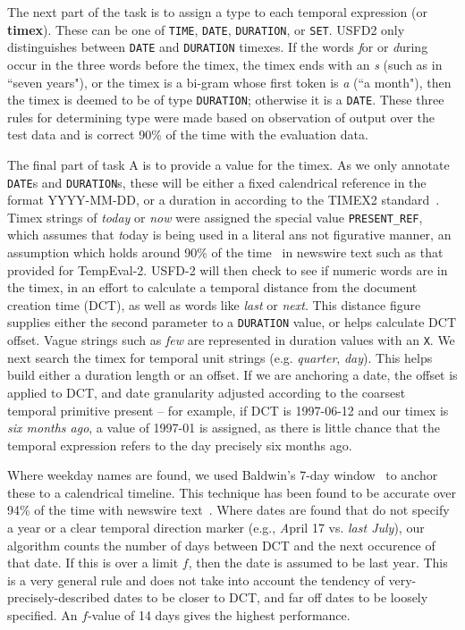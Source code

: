 \documentclass[11pt]{article}
\begin{document}
The next part of the task is to assign a type to each temporal expression (or {\bf timex}). These can be one of {\tt TIME}, {\tt DATE}, {\tt DURATION}, or {\tt SET}. USFD2 only distinguishes between {\tt DATE} and {\tt DURATION} timexes. If the words {\emph for} or {\emph during} occur in the three words before the timex, the timex ends with an {\emph s} (such as in ``seven years"), or the timex is a bi-gram whose first token is {\emph a} (``a month"), then the timex is deemed to be of type {\tt DURATION}; otherwise it is a {\tt DATE}. These three rules for determining type were made based on observation of output over the test data and is correct 90\% of the time with the evaluation data.

The final part of task A is to provide a value for the timex. As we only annotate {\tt DATE}s and {\tt DURATION}s, these will be either a fixed calendrical reference in the format YYYY-MM-DD, or a duration in according to the TIMEX2 standard~\cite{ferro2005tides}. Timex strings of \emph{today} or \emph{now} were assigned the special value {\tt PRESENT\_REF}, which assumes that {\emph today} is being used in a literal ans not figurative manner, an assumption which holds around 90\% of the time~\cite{ahn2005towards} in newswire text such as that provided for TempEval-2. USFD-2 will then check to see if numeric words are in the timex, in an effort to calculate a temporal distance from the document creation time (DCT), as well as words like \emph{last} or \emph{next}. This distance figure supplies either the second parameter to a {\tt DURATION} value, or helps calculate DCT offset. Vague strings such as \emph{few} are represented in duration values with an {\tt X}. We next search the timex for temporal unit strings (e.g. \emph{quarter}, \emph{day}). This helps build either a duration length or an offset. If we are anchoring a date, the offset is applied to DCT, and date granularity adjusted according to the coarsest temporal primitive present -- for example, if DCT is 1997-06-12 and our timex is \emph{six months ago}, a value of 1997-01 is assigned, as there is little chance that the temporal expression refers to the day precisely six months ago.

Where weekday names are found, we used Baldwin's 7-day window~\cite{baldwin2002learning} to anchor these to a calendrical timeline. This technique has been found to be accurate over 94\% of the time with newswire text~\cite{mazur2008s}. Where dates are found that do not specify a year or a clear temporal direction marker (e.g., {\emph April 17} vs. \emph{last July}), our algorithm counts the number of days between DCT and the next occurence of that date. If this is over a limit $f$, then the date is assumed to be last year. This is a very general rule and does not take into account the tendency of very-precisely-described dates to be closer to DCT, and far off dates to be loosely specified. An $f$-value of 14 days gives the highest performance.
\end{document}
